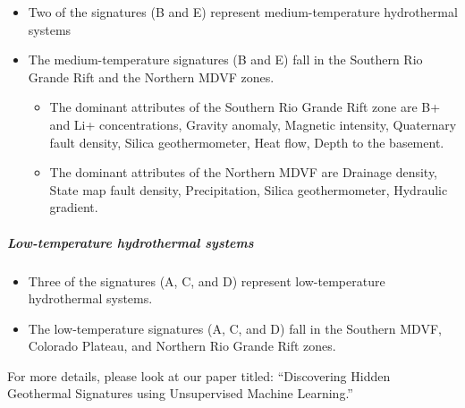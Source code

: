 \documentclass[11pt]{article}
\providecommand{\tightlist}{%
      \setlength{\itemsep}{0pt}\setlength{\parskip}{0pt}}
\begin{document}
\begin{itemize}
\tightlist
\item
  Two of the signatures (B and E) represent medium-temperature
  hydrothermal systems
\item
  The medium-temperature signatures (B and E) fall in the Southern Rio
  Grande Rift and the Northern MDVF zones.

  \begin{itemize}
  \tightlist
  \item
    The dominant attributes of the Southern Rio Grande Rift zone are B+
    and Li+ concentrations, Gravity anomaly, Magnetic intensity,
    Quaternary fault density, Silica geothermometer, Heat flow, Depth to
    the basement.
  \item
    The dominant attributes of the Northern MDVF are Drainage density,
    State map fault density, Precipitation, Silica geothermometer,
    Hydraulic gradient.
  \end{itemize}
\end{itemize}

\hypertarget{low-temperature-hydrothermal-systems}{%
\subparagraph{Low-temperature hydrothermal
systems}\label{low-temperature-hydrothermal-systems}}

\begin{itemize}
\tightlist
\item
  Three of the signatures (A, C, and D) represent low-temperature
  hydrothermal systems.
\item
  The low-temperature signatures (A, C, and D) fall in the Southern
  MDVF, Colorado Plateau, and Northern Rio Grande Rift zones.
\end{itemize}

For more details, please look at our paper titled: ``Discovering Hidden
Geothermal Signatures using Unsupervised Machine Learning.''


\end{document}
